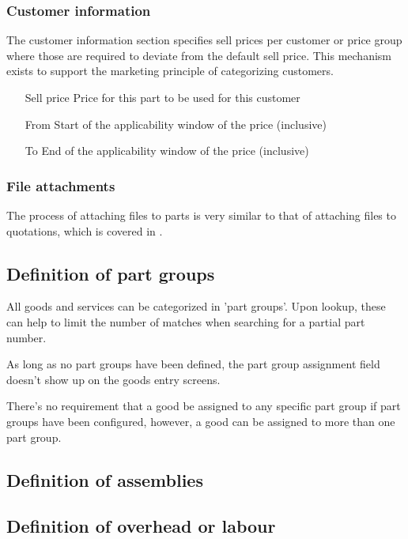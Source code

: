 \subsubsection{Customer information}

The customer information section specifies sell prices per customer or price group
where those are required to deviate from the default sell price. This mechanism exists
to support the marketing principle of categorizing customers.

\begin{itemize}
\item [Sell price] Price for this part to be used for this customer
\item [From] Start of the applicability window of the price (inclusive)
\item [To] End of the applicability window of the price (inclusive)
\end{itemize}

\subsubsection{File attachments}

The process of attaching files to parts is very similar to that of
attaching files to quotations, which is covered in .

\subsection{Definition of part groups}

All goods and services can be categorized in 'part groups'. Upon lookup, these can
help to limit the number of matches when searching for a partial part number.

As long as no part groups have been defined, the part group assignment field doesn't
show up on the goods entry screens.

There's no requirement that a good be assigned to any specific part group if part
groups have been configured, however, a good can be assigned to more than one part group.

\subsection{Definition of assemblies}



\subsection{Definition of overhead or labour}


